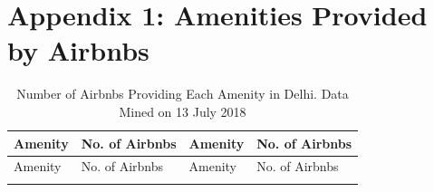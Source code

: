 \documentclass[a4paper, 12pt, twoside]{article}
\begin{document}
  \section*{Appendix 1: Amenities Provided by Airbnbs}
\small
\centering
\begin{longtable}[l]{>{\raggedright}p{5cm}>{\centering}p{2cm}p{5cm}>{\centering\arraybackslash}p{2cm}}
\caption{Number of Airbnbs Providing Each Amenity in Delhi. Data Mined on 13 July 2018} \\
\toprule
Amenity & No. of Airbnbs & Amenity & No. of Airbnbs \\
\midrule
\endfirsthead
\toprule
Amenity & No. of Airbnbs & Amenity & No. of Airbnbs \\
\midrule
\endhead
\endfoot
\endlastfoot


\end{longtable}
\end{document}

